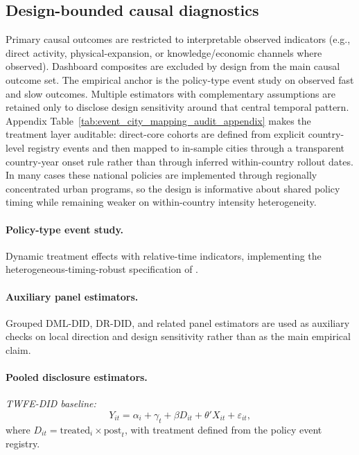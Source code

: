 \documentclass[11pt,a4paper]{article}
\begin{document}
\subsection{Design-bounded causal diagnostics}
Primary causal outcomes are restricted to interpretable observed indicators (e.g., direct activity, physical-expansion, or knowledge/economic channels where observed).
Dashboard composites are excluded by design from the main causal outcome set.
The empirical anchor is the policy-type event study on observed fast and slow outcomes.
Multiple estimators with complementary assumptions are retained only to disclose design sensitivity around that central temporal pattern.
Appendix Table~\ref{tab:event_city_mapping_audit_appendix} makes the treatment layer auditable: direct-core cohorts are defined from explicit country-level registry events and then mapped to in-sample cities through a transparent country-year onset rule rather than through inferred within-country rollout dates.
In many cases these national policies are implemented through regionally concentrated urban programs, so the design is informative about shared policy timing while remaining weaker on within-country intensity heterogeneity.

\paragraph{Policy-type event study.} Dynamic treatment effects with relative-time indicators, implementing the heterogeneous-timing-robust specification of \citet{sun2021event}.

\paragraph{Auxiliary panel estimators.} Grouped DML-DID, DR-DID, and related panel estimators are used as auxiliary checks on local direction and design sensitivity rather than as the main empirical claim.

\paragraph{Pooled disclosure estimators.}
\textit{TWFE-DID baseline:}
\begin{equation}
  \mathit{Y}_{it} = \alpha_i + \gamma_t + \beta \mathit{D}_{it} + \theta' \mathit{X}_{it} + \varepsilon_{it},
\end{equation}
where $\mathit{D}_{it} = \text{treated}_i \times \text{post}_t$, with treatment defined from the policy event registry.
\end{document}
